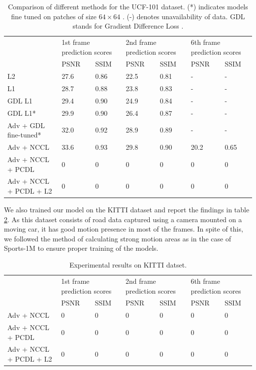 \documentclass{article}
\begin{document}
  \begin{table}[!htbp]
  	\centering
  	\caption{Comparison of different methods for the UCF-101 dataset. (*) indicates models fine tuned on patches of size $ 64 \times 64 $ \cite{mathieu2015deep}. (-) denotes unavailability of data. GDL stands for Gradient Difference Loss \cite{mathieu2015deep}.}
  	\begin{tabular}{p{4cm}p{1cm}p{1cm}p{1cm}p{1cm}p{1cm}p{1cm}}
  		\hline
  		\multirow{2}{*}{} &
  		\multicolumn{2}{p{2.5cm}}{1st frame prediction scores} &
  		\multicolumn{2}{p{2.5cm}}{2nd frame prediction scores} &
  		\multicolumn{2}{p{2.5cm}}{6th frame prediction scores} \\
  		Methods & PSNR & SSIM & PSNR & SSIM & PSNR & SSIM \\
  		\hline
  		L2 & 27.6 & 0.86 & 22.5 & 0.81 & - & - \\
  		\hline
  		L1 & 28.7 & 0.88 & 23.8 & 0.83 & - & - \\
  		\hline
  		GDL L1 & 29.4 & 0.90 & 24.9 & 0.84 & - & - \\
  		\hline
  		GDL L1* & 29.9 & 0.90 & 26.4 & 0.87 & - & - \\
  		\hline
  		Adv + GDL fine-tuned* & 32.0 & 0.92 & 28.9 & 0.89 & - & - \\
  		\hline
  		Adv + NCCL & 33.6 & 0.93 & 29.8 & 0.90 & 20.2 & 0.65 \\
  		\hline
  		Adv + NCCL + PCDL & 0 & 0 & 0 & 0 & 0 & 0 \\
  		\hline
  		Adv + NCCL + PCDL + L2 & 0 & 0 & 0 & 0 & 0 & 0 \\
  		\hline
  	\end{tabular}
  	\label{tab:ucf}
  \end{table}
   
   We also trained our model on the KITTI dataset and report the findings in table \ref{tab:kitti}. As this dataset consists of road data captured using a camera mounted on a moving car, it has good motion presence in most of the frames. In spite of this, we followed the method of calculating strong motion areas as in the case of Sports-1M to ensure proper training of the models.
   
   \begin{table}[t]
	   	\caption{Experimental results on KITTI datset.}
	   \begin{tabular}{p{4cm}p{1cm}p{1cm}p{1cm}p{1cm}p{1cm}p{1cm}}
	   	\hline
	   	\multirow{2}{*}{} &
	   	\multicolumn{2}{p{2.5cm}}{1st frame prediction scores} &
	   	\multicolumn{2}{p{2.5cm}}{2nd frame prediction scores} &
	   	\multicolumn{2}{p{2.5cm}}{6th frame prediction scores} \\
	   	Methods & PSNR & SSIM & PSNR & SSIM & PSNR & SSIM \\
	   	\hline
	   	Adv + NCCL & 0 & 0 & 0 & 0 & 0 & 0 \\
	   	\hline
	   	Adv + NCCL + PCDL & 0 & 0 & 0 & 0 & 0 & 0 \\
	   	\hline
	   	Adv + NCCL + PCDL + L2 & 0 & 0 & 0 & 0 & 0 & 0 \\
	   	\hline
	   \end{tabular}
	   \label{tab:kitti}
	\end{table}
   
\end{document}
